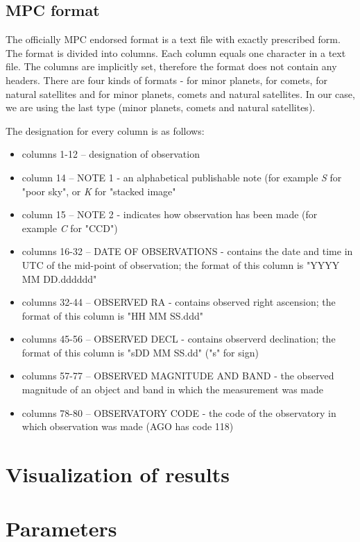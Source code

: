 \subsection{MPC format}

	The officially MPC endorsed format is a text file with exactly prescribed form. The format is divided into columns. Each column equals one character in a text file. The columns are implicitly set, therefore the format does not contain any headers. There are four kinds of formats - for minor planets, for comets, for natural satellites and for minor planets, comets and natural satellites. In our case, we are using the last type (minor planets, comets and natural satellites).
	
	The designation for every column is as follows:
	
	\begin{itemize}
		\item columns 1-12 -- designation of observation
		\item column 14 -- NOTE 1 - an alphabetical publishable note (for example \emph{S} for "poor sky", or \emph{K} for "stacked image"
		\item column 15 -- NOTE 2 - indicates how observation has been made (for example \emph{C} for "CCD")
		\item columns 16-32 -- DATE OF OBSERVATIONS - contains the date and time in UTC of the mid-point of observation; the format of this column is "YYYY MM DD.dddddd"
		\item columns 32-44 -- OBSERVED RA - contains observed right ascension; the format of this column is "HH MM SS.ddd"
		\item columns 45-56 -- OBSERVED DECL - contains observerd declination; the format of this column is "sDD MM SS.dd" ("s" for sign)
		\item columns 57-77 -- OBSERVED MAGNITUDE AND BAND - the observed magnitude of an object and band in which the measurement was made
		\item columns 78-80 -- OBSERVATORY CODE - the code of the observatory in which observation was made (AGO has code 118)
	\end{itemize}

	\citep{mpc}

\section{Visualization of results}\label{sec:visualization}

\section{Parameters}\label{sec:parameters}
